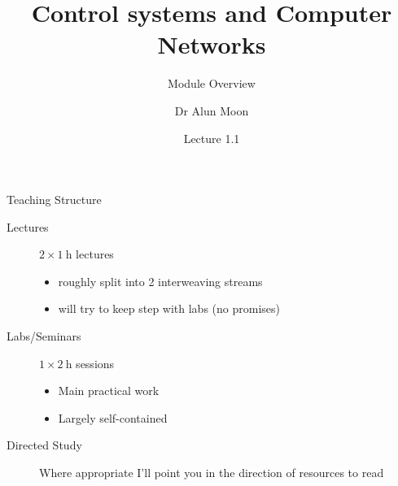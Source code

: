 \documentclass[xcolor=svgnames]{beamer}
\title{Control systems and Computer Networks}
\subtitle{Module Overview}
\author{Dr Alun Moon}
\date{Lecture 1.1}
\begin{document}
\frame{\maketitle}

\begin{frame}{Teaching Structure}
  \begin{description}
    \item[Lectures] $2 \times \SI{1}{\hour}$ lectures
    \begin{itemize}
      \item roughly split into 2 interweaving streams
      \item will try to keep step with labs (no promises)
    \end{itemize}
    \item[Labs/Seminars] $1\times\SI{2}{\hour}$ sessions
    \begin{itemize}
      \item Main practical work
      \item Largely self-contained
    \end{itemize}
    \item[Directed Study] Where appropriate I'll point you in the direction of resources to read
  \end{description}
\end{frame}
\end{document}
